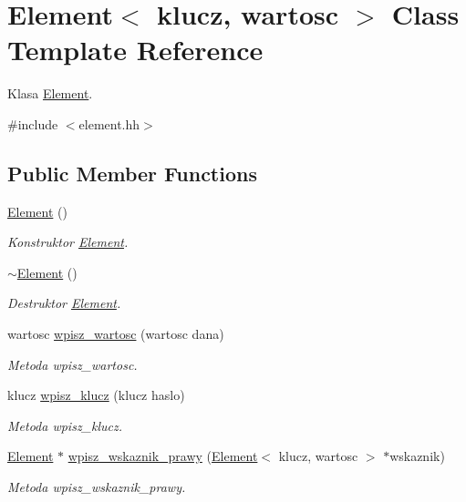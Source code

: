 \hypertarget{class_element}{\section{Element$<$ klucz, wartosc $>$ Class Template Reference}
\label{class_element}
}


Klasa \hyperlink{class_element}{Element}.  




{\ttfamily \#include $<$element.\-hh$>$}

\subsection*{Public Member Functions}
\begin{DoxyCompactItemize}
\item 
\hyperlink{class_element_a2908ce7965da27acf29ba7a8ed702a9e}{Element} ()
\begin{DoxyCompactList}\small\item\em Konstruktor \hyperlink{class_element}{Element}. \end{DoxyCompactList}\item 
\hyperlink{class_element_a35ad2ab7777b71252bc38005c6370785}{$\sim$\-Element} ()
\begin{DoxyCompactList}\small\item\em Destruktor \hyperlink{class_element}{Element}. \end{DoxyCompactList}\item 
wartosc \hyperlink{class_element_a9e53cf7a1b06c07beabd972d31d2d9f9}{wpisz\-\_\-wartosc} (wartosc dana)
\begin{DoxyCompactList}\small\item\em Metoda wpisz\-\_\-wartosc. \end{DoxyCompactList}\item 
klucz \hyperlink{class_element_a51aa3e750ac6c3c99b5a5d536ec0a316}{wpisz\-\_\-klucz} (klucz haslo)
\begin{DoxyCompactList}\small\item\em Metoda wpisz\-\_\-klucz. \end{DoxyCompactList}\item 
\hyperlink{class_element}{Element} $\ast$ \hyperlink{class_element_aa2fa90e91a6bd79f75d9b262c68cf34f}{wpisz\-\_\-wskaznik\-\_\-prawy} (\hyperlink{class_element}{Element}$<$ klucz, wartosc $>$ $\ast$wskaznik)
\begin{DoxyCompactList}\small\item\em Metoda wpisz\-\_\-wskaznik\-\_\-prawy. \end{DoxyCompactList}\item 

\end{DoxyCompactItemize}
